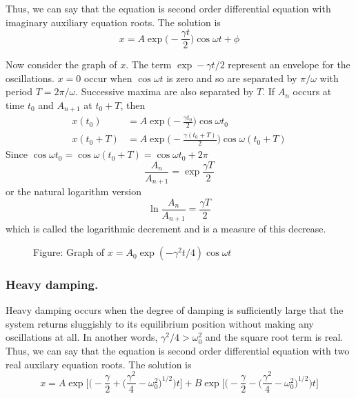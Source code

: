 \documentclass[../../../main.tex]{subfiles}
\begin{document}
Thus, we can say that the equation is second order differential equation with imaginary auxiliary equation roots. The solution is
\begin{equation*}
    x=A\exp\biggl(-\frac{\gamma t}{2}\biggr)\cos\omega t +\phi
\end{equation*} 

Now consider the graph of $x$. The term $\exp -\gamma t/2$ represent an envelope for the oscillations. $x=0$ occur when $\cos\omega t$ is zero and so are separated by $\pi/\omega$ with period $T=2\pi/\omega$. Successive maxima are also separated by $T$. If $A_n$ occurs at time $t_0$ and $A_{n+1}$ at $t_0+T$, then 
\begin{align*}
    x(t_0)&=A\exp\biggl(-\frac{\gamma t_0}{2}\biggr)\cos\omega t_0\\
    x(t_0+T)&=A\exp\biggl(-\frac{\gamma (t_0+T)}{2}\biggr)\cos\omega (t_0+T)
\end{align*}
Since $\cos\omega t_0=\cos\omega (t_0+T)=\cos\omega t_0+2\pi$
\begin{equation*}
    \frac{A_n}{A_{n+1}}=\exp \frac{\gamma T}{2}
\end{equation*} 
or the natural logarithm version
\begin{equation*}
    \ln \frac{A_n}{A_{n+1}}=\frac{\gamma T}{2}
\end{equation*}
which is called the logarithmic decrement and is a measure of this decrease. 
\begin{figure*}[b]
    \centering
    \caption*{Figure: Graph of $x=A_0\exp(-\gamma^2t/4)\cos \omega t$}
\end{figure*}

\subsubsection*{Heavy damping.} Heavy damping occurs when the degree of damping is sufficiently large that the system returns sluggishly to its equilibrium position without making any oscillations at all. In another words, $\gamma^2/4 > \omega_0^2$ and the square root term is real. Thus, we can say that the equation is second order differential equation with two real auxilary equation roots. The solution is
\begin{equation*}
    x=A\exp \biggl[\bigg(-\frac{\gamma}{2} + \big(\frac{\gamma^2}{4}-\omega_0^2\big)^{1/2}\bigg)t\biggr] +B \exp \biggl[\bigg(-\frac{\gamma}{2} - \big(\frac{\gamma^2}{4}-\omega_0^2\big)^{1/2}\bigg)t\biggr]
\end{equation*}
\end{document}
